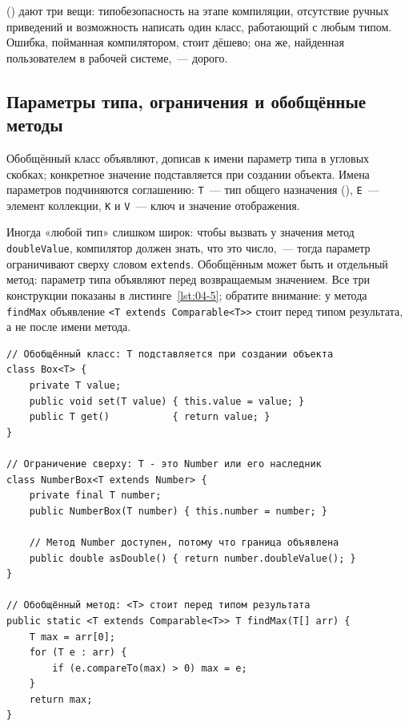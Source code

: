  () дают три вещи: типобезопасность на этапе
компиляции, отсутствие ручных приведений и возможность написать один класс,
работающий с любым типом. Ошибка, пойманная компилятором, стоит дёшево; она же,
найденная пользователем в рабочей системе,~--- дорого.

\subsection{Параметры типа, ограничения и обобщённые методы}

Обобщённый класс объявляют, дописав к имени параметр типа в угловых скобках;
конкретное значение подставляется при создании объекта. Имена параметров
подчиняются соглашению: \texttt{T}~--- тип общего назначения (),
\texttt{E}~--- элемент коллекции, \texttt{K} и \texttt{V}~--- ключ и значение
отображения.

Иногда «любой тип» слишком широк: чтобы вызвать у значения метод
\texttt{doubleValue}, компилятор должен знать, что это число,~--- тогда
параметр ограничивают сверху словом \texttt{extends}. Обобщённым может быть и
отдельный метод: параметр типа объявляют перед возвращаемым значением. Все три
конструкции показаны в листинге~\ref{lst:04-5}; обратите внимание: у метода
\texttt{findMax} объявление \texttt{<T extends Comparable<T>>} стоит перед типом
результата, а не после имени метода.

\begin{listing}[H]
\begin{verbatim}
// Обобщённый класс: T подставляется при создании объекта
class Box<T> {
    private T value;
    public void set(T value) { this.value = value; }
    public T get()           { return value; }
}

// Ограничение сверху: T - это Number или его наследник
class NumberBox<T extends Number> {
    private final T number;
    public NumberBox(T number) { this.number = number; }

    // Метод Number доступен, потому что граница объявлена
    public double asDouble() { return number.doubleValue(); }
}

// Обобщённый метод: <T> стоит перед типом результата
public static <T extends Comparable<T>> T findMax(T[] arr) {
    T max = arr[0];
    for (T e : arr) {
        if (e.compareTo(max) > 0) max = e;
    }
    return max;
}
\end{verbatim}
\caption{Обобщённый класс, ограничение типа и обобщённый метод}
\label{lst:04-5}
\end{listing}

